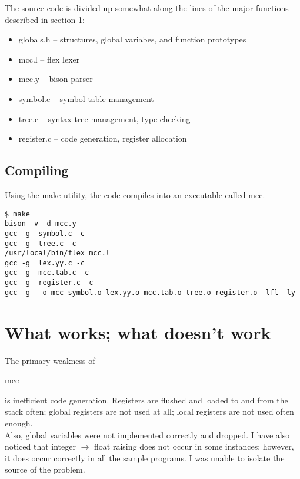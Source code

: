 The source code is divided up somewhat along the lines of the
major functions described in section 1:

\begin{itemize}

\item globals.h -- structures, global variabes, and function prototypes

\item mcc.l -- flex lexer

\item mcc.y -- bison parser

\item symbol.c -- symbol table management

\item tree.c -- syntax tree management, type checking

\item register.c -- code generation, register allocation
\end{itemize}

\subsection{Compiling}

Using the make utility, the code compiles into an executable called mcc.

\begin{verbatim}
$ make 
bison -v -d mcc.y
gcc -g  symbol.c -c
gcc -g  tree.c -c
/usr/local/bin/flex mcc.l
gcc -g  lex.yy.c -c
gcc -g  mcc.tab.c -c
gcc -g  register.c -c
gcc -g  -o mcc symbol.o lex.yy.o mcc.tab.o tree.o register.o -lfl -ly
\end{verbatim}

\section{What works; what doesn't work}

The primary weakness of \begin{it}mcc\end{it} is inefficient code
generation.  Registers are flushed and loaded to and from the
stack often; global registers are not used at all; local registers are not
used often enough. \\


Also, global variables were not implemented correctly and dropped.  I 
have also noticed that integer $\rightarrow$ float raising does
not occur in some instances; however, it does occur correctly in
all the sample programs.  I was unable to isolate the source
of the problem.

